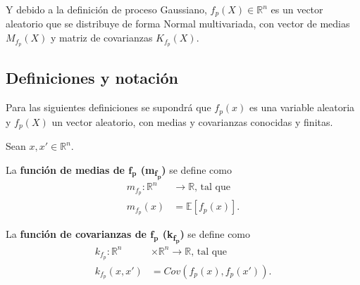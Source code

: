 Y debido a la definici\'on de proceso Gaussiano, $f_p(X) \in \mathbb{R}^n$ es un vector aleatorio que se distribuye de forma Normal multivariada, con vector de medias $M_{f_p}(X)$ y matriz de covarianzas $K_{f_p}(X)$.


\subsection{Definiciones y notaci\'on}

Para las siguientes definiciones se supondrá que $f_p(x)$ es una variable aleatoria y $f_p(X)$ un vector aleatorio, con medias y covarianzas conocidas y finitas.

\begin{defin*}
Sean $x,x' \in \mathbb{R}^n$.

La \textbf{función de medias de $\bm{f_p}$ (m\textsubscript{$\bm{f_p}$})} se define como 
\begin{equation*}
\begin{aligned}
    m_{f_p}: \mathbb{R}^n &\rightarrow \mathbb{R} 
    \text{, tal que}\\
    m_{f_p}(x) &= \mathbb{E}[f_p(x)].
\end{aligned}
\end{equation*}

La \textbf{función de covarianzas de $\bm{f_p}$ (k\textsubscript{$\bm{f_p}$})} se define como 
\begin{equation*}
\begin{aligned}
    k_{f_p}: \mathbb{R}^n &\times \mathbb{R}^n \rightarrow \mathbb{R} 
    \text{, tal que}\\
    k_{f_p}(x, x') &= Cov({f_p}(x),{f_p}(x')).
\end{aligned}
\end{equation*}
\end{defin*}

